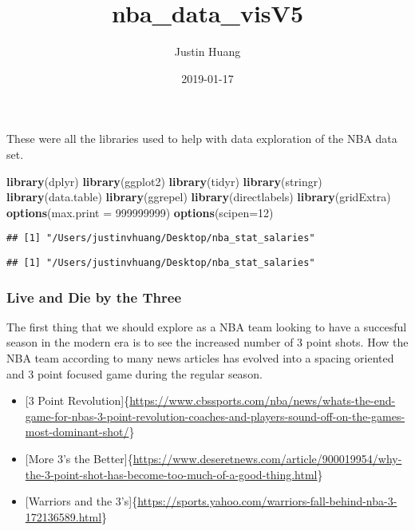 \documentclass[]{article}
\title{nba\_data\_visV5}
\author{Justin Huang}
\date{2019-01-17}
\newenvironment{Shaded}{\begin{snugshade}}{\end{snugshade}}
\newcommand{\KeywordTok}[1]{\textcolor[rgb]{0.13,0.29,0.53}{\textbf{#1}}}
\newcommand{\DataTypeTok}[1]{\textcolor[rgb]{0.13,0.29,0.53}{#1}}
\newcommand{\DecValTok}[1]{\textcolor[rgb]{0.00,0.00,0.81}{#1}}
\newcommand{\NormalTok}[1]{#1}
\providecommand{\tightlist}{%
  \setlength{\itemsep}{0pt}\setlength{\parskip}{0pt}}
\begin{document}
\maketitle

These were all the libraries used to help with data exploration of the
NBA data set.

\begin{Shaded}
\begin{Highlighting}[]
\KeywordTok{library}\NormalTok{(dplyr)}
\KeywordTok{library}\NormalTok{(ggplot2)}
\KeywordTok{library}\NormalTok{(tidyr)}
\KeywordTok{library}\NormalTok{(stringr)}
\KeywordTok{library}\NormalTok{(data.table)}
\KeywordTok{library}\NormalTok{(ggrepel)}
\KeywordTok{library}\NormalTok{(directlabels)}
\KeywordTok{library}\NormalTok{(gridExtra)}
\KeywordTok{options}\NormalTok{(}\DataTypeTok{max.print =} \DecValTok{999999999}\NormalTok{)}
\KeywordTok{options}\NormalTok{(}\DataTypeTok{scipen=}\DecValTok{12}\NormalTok{)}
\end{Highlighting}
\end{Shaded}

\begin{verbatim}
## [1] "/Users/justinvhuang/Desktop/nba_stat_salaries"
\end{verbatim}

\begin{verbatim}
## [1] "/Users/justinvhuang/Desktop/nba_stat_salaries"
\end{verbatim}

\subsubsection{Live and Die by the
Three}\label{live-and-die-by-the-three}

The first thing that we should explore as a NBA team looking to have a
succesful season in the modern era is to see the increased number of 3
point shots. How the NBA team according to many news articles has
evolved into a spacing oriented and 3 point focused game during the
regular season.

\begin{itemize}
\tightlist
\item
  {[}3 Point
  Revolution{]}\{\url{https://www.cbssports.com/nba/news/whats-the-end-game-for-nbas-3-point-revolution-coaches-and-players-sound-off-on-the-games-most-dominant-shot/}\}
\item
  {[}More 3's the
  Better{]}\{\url{https://www.deseretnews.com/article/900019954/why-the-3-point-shot-has-become-too-much-of-a-good-thing.html}\}
\item
  {[}Warriors and the
  3's{]}\{\url{https://sports.yahoo.com/warriors-fall-behind-nba-3-172136589.html}\}
\end{itemize}
\end{document}
